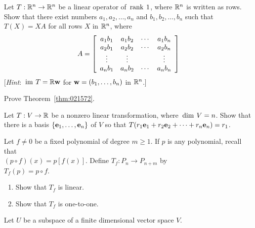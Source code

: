 \begin{multicols}{2}
\columnbreak
\begin{ex}
Let $T : \mathbb{R}^n \to \mathbb{R}^n$ be a linear operator of $\thinspace\operatorname{rank \medspace}1$, where $\mathbb{R}^n$ is written as rows. Show that there exist numbers $a_{1}, a_{2}, \dots, a_{n}$ and $b_{1}, b_{2}, \dots, b_{n}$ such that $T(X) = XA$ for all rows $X$ in $\mathbb{R}^n$, where
\begin{equation*}
A = \left[ \begin{array}{cccc}
a_{1}b_{1} & a_{1}b_{2} & \cdots & a_{1}b_{n} \\
a_{2}b_{1} & a_{2}b_{2} & \cdots  & a_{2}b_{n} \\
\vdots & \vdots &  & \vdots \\
a_{n}b_{1} & a_{n}b_{2} & \cdots & a_{n}b_{n}
\end{array} \right]
\end{equation*}
[\textit{Hint}: $\thinspace\operatorname{im \medspace}T = \mathbb{R}\textbf{w}$ for $\textbf{w} = (b_{1}, \dots, b_{n})$ in $\mathbb{R}^n$.]
\end{ex}

\begin{ex}\label{ex:ex7_2_26}
Prove Theorem~\ref{thm:021572}.
\end{ex}

\begin{ex}
Let $T : V \to \mathbb{R}$ be a nonzero linear transformation, where $\thinspace\operatorname{dim \medspace}V = n$. Show that there is a basis $\{\textbf{e}_{1}, \dots, \textbf{e}_{n}\}$ of $V$ so that $T(r_{1}\textbf{e}_{1} + r_{2}\textbf{e}_{2} + \cdots + r_{n}\textbf{e}_{n}) = r_{1}$.
\end{ex}

\begin{ex}
Let $f \neq 0$ be a fixed polynomial of degree $m \geq 1$. If $p$ is any polynomial, recall that \\ $(p \circ f)(x) = p\left[f(x)\right]$. Define $T_{f} : P_{n} \to P_{n+m}$ by \\ $T_{f}(p) = p \circ f$.


\begin{enumerate}[label={\alph*.}]
\item Show that $T_{f}$ is linear.

\item Show that $T_{f}$ is one-to-one.

\end{enumerate}
\end{ex}

\begin{ex}
Let $U$ be a subspace of a finite dimensional vector space $V$.



\end{ex}
\end{multicols}
